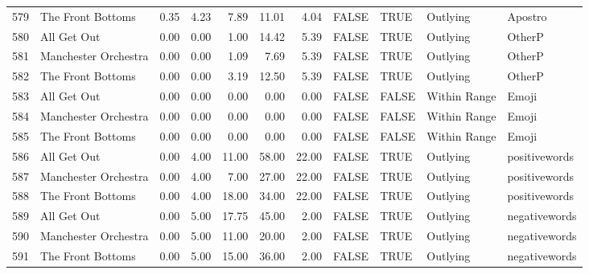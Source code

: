 \begin{table}[ht]
\begin{tabular}{rlrrrrrllll}
  579 & The Front Bottoms & 0.35 & 4.23 & 7.89 & 11.01 & 4.04 & FALSE & TRUE & Outlying & Apostro \\ 
  580 & All Get Out & 0.00 & 0.00 & 1.00 & 14.42 & 5.39 & FALSE & TRUE & Outlying & OtherP \\ 
  581 & Manchester Orchestra & 0.00 & 0.00 & 1.09 & 7.69 & 5.39 & FALSE & TRUE & Outlying & OtherP \\ 
  582 & The Front Bottoms & 0.00 & 0.00 & 3.19 & 12.50 & 5.39 & FALSE & TRUE & Outlying & OtherP \\ 
  583 & All Get Out & 0.00 & 0.00 & 0.00 & 0.00 & 0.00 & FALSE & FALSE & Within Range & Emoji \\ 
  584 & Manchester Orchestra & 0.00 & 0.00 & 0.00 & 0.00 & 0.00 & FALSE & FALSE & Within Range & Emoji \\ 
  585 & The Front Bottoms & 0.00 & 0.00 & 0.00 & 0.00 & 0.00 & FALSE & FALSE & Within Range & Emoji \\ 
  586 & All Get Out & 0.00 & 4.00 & 11.00 & 58.00 & 22.00 & FALSE & TRUE & Outlying & positivewords \\ 
  587 & Manchester Orchestra & 0.00 & 4.00 & 7.00 & 27.00 & 22.00 & FALSE & TRUE & Outlying & positivewords \\ 
  588 & The Front Bottoms & 0.00 & 4.00 & 18.00 & 34.00 & 22.00 & FALSE & TRUE & Outlying & positivewords \\ 
  589 & All Get Out & 0.00 & 5.00 & 17.75 & 45.00 & 2.00 & FALSE & TRUE & Outlying & negativewords \\ 
  590 & Manchester Orchestra & 0.00 & 5.00 & 11.00 & 20.00 & 2.00 & FALSE & TRUE & Outlying & negativewords \\ 
  591 & The Front Bottoms & 0.00 & 5.00 & 15.00 & 36.00 & 2.00 & FALSE & TRUE & Outlying & negativewords \\ 
   \hline
\end{tabular}
\end{table}
